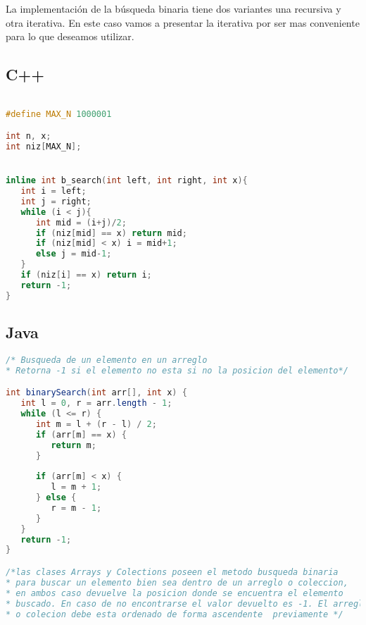 La implementación de la búsqueda binaria tiene dos variantes una recursiva y otra iterativa. En este caso vamos a presentar la iterativa por ser mas conveniente para lo que deseamos utilizar.

\subsection{C++}
\lstset{language=C++, breaklines=true, basicstyle=\footnotesize}
\begin{lstlisting}[language=C++]

#define MAX_N 1000001

int n, x;
int niz[MAX_N];


inline int b_search(int left, int right, int x){
   int i = left;
   int j = right;
   while (i < j){
      int mid = (i+j)/2;
      if (niz[mid] == x) return mid;
      if (niz[mid] < x) i = mid+1;
      else j = mid-1;
   }
   if (niz[i] == x) return i;
   return -1;
}
\end{lstlisting}

\subsection{Java}
\begin{lstlisting}[language=Java]
/* Busqueda de un elemento en un arreglo
* Retorna -1 si el elemento no esta si no la posicion del elemento*/

int binarySearch(int arr[], int x) {
   int l = 0, r = arr.length - 1;
   while (l <= r) {
      int m = l + (r - l) / 2;
      if (arr[m] == x) {
         return m;
      }
		
      if (arr[m] < x) {
         l = m + 1;
      } else {
         r = m - 1;
      }
   }
   return -1;
}

/*las clases Arrays y Colections poseen el metodo busqueda binaria 
* para buscar un elemento bien sea dentro de un arreglo o coleccion, 
* en ambos caso devuelve la posicion donde se encuentra el elemento 
* buscado. En caso de no encontrarse el valor devuelto es -1. El arreglo
* o colecion debe esta ordenado de forma ascendente  previamente */

\end{lstlisting}
